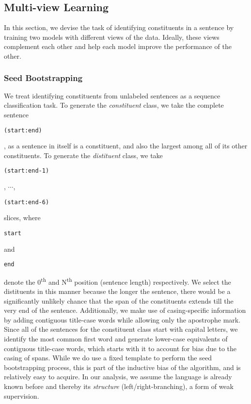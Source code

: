 \documentclass[11pt]{article}
\begin{document}
\subsection{Multi-view Learning}
\label{ssec:multi-view-learning}
In this section, we devise the task of identifying constituents in a sentence by training two models with different views of the data. Ideally, these views complement each other and help each model improve the performance of the other.

\subsubsection{Seed Bootstrapping}
\label{ssec:seed-bootstrap}

We treat identifying constituents from unlabeled sentences as a sequence classification task. To generate the \emph{constituent} class, we take the complete sentence \begin{small}\texttt{(start:end)}\end{small}, as a sentence in itself is a constituent, and also the largest among all of its other constituents. To generate the \emph{distituent} class, we take \begin{small}\texttt{(start:end-1)}\end{small}, $\cdots$, \begin{small}\texttt{(start:end-6)}\end{small} slices, where \begin{small}{\texttt{start}}\end{small} and \begin{small}{\texttt{end}}\end{small} denote the 0\textsuperscript{th} and N\textsuperscript{th} position (sentence length) respectively. We select the distituents in this manner because the longer the sentence, there would be a significantly unlikely chance that the span of the constituents extends till the very end of the sentence.
Additionally, we make use of casing-specific information by adding contiguous title-case words while allowing only the apostrophe mark. Since all of the sentences for the constituent class start with capital letters, we identify the most common first word and generate lower-case equivalents of contiguous title-case words, which starts with it to account for bias due to the casing of spans. While we do use a fixed template to perform the seed bootstrapping process, this is part of the inductive bias of the algorithm, and is relatively easy to acquire. In our analysis, we assume the language is already known before and thereby its \emph{structure} (left/right-branching), a form of weak supervision.
\end{document}
